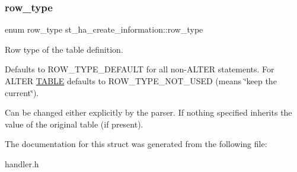 \subsubsection{\texorpdfstring{row\+\_\+type}{row\_type}}
{\footnotesize\ttfamily enum row\+\_\+type st\+\_\+ha\+\_\+create\+\_\+information\+::row\+\_\+type}

Row type of the table definition.

Defaults to R\+O\+W\+\_\+\+T\+Y\+P\+E\+\_\+\+D\+E\+F\+A\+U\+LT for all non-\/A\+L\+T\+ER statements. For A\+L\+T\+ER \mbox{\hyperlink{structTABLE}{T\+A\+B\+LE}} defaults to R\+O\+W\+\_\+\+T\+Y\+P\+E\+\_\+\+N\+O\+T\+\_\+\+U\+S\+ED (means \char`\"{}keep the current\char`\"{}).

Can be changed either explicitly by the parser. If nothing specified inherits the value of the original table (if present). 

The documentation for this struct was generated from the following file\+:\begin{DoxyCompactItemize}
\item 
handler.\+h\end{DoxyCompactItemize}
